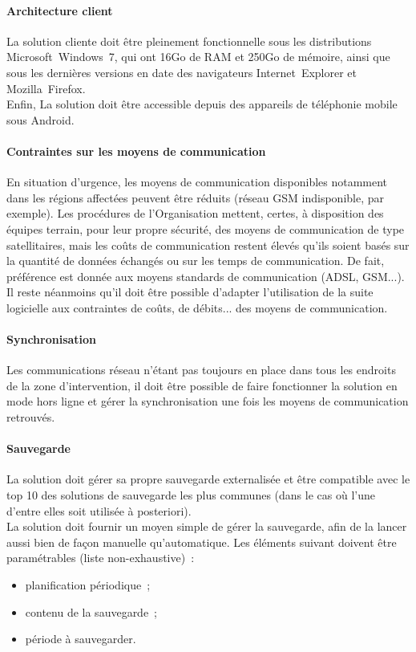 \paragraph{Architecture client}
La solution cliente doit être pleinement fonctionnelle sous les distributions Microsoft~Windows~7, qui ont 16Go de RAM et 250Go de mémoire, ainsi que sous les dernières versions en date des navigateurs Internet~Explorer et Mozilla~Firefox.
\\
Enfin, La solution doit être accessible depuis des appareils de téléphonie mobile sous Android.

\paragraph{Contraintes sur les moyens de communication}
En situation d'urgence, les moyens de communication disponibles notamment dans les régions affectées peuvent être \og{}réduits\fg{} (réseau GSM indisponible, par exemple). Les procédures de l'Organisation mettent, certes, à disposition des équipes terrain, pour leur propre sécurité, des moyens de communication de type satellitaires, mais les coûts de communication restent élevés qu'ils soient basés sur la quantité de données échangés ou sur les temps de communication. De fait, préférence est donnée aux moyens \og{}standards\fg{} de communication (ADSL, GSM...). Il reste néanmoins qu'il doit être possible d'adapter l'utilisation de la suite logicielle aux contraintes de coûts, de débits... des moyens de communication.

\paragraph{Synchronisation}
Les communications réseau n'étant pas toujours en place dans tous les endroits de la zone d'intervention, il doit être possible de faire fonctionner la solution en mode \og{}hors ligne\fg{} et gérer la synchronisation une fois les moyens de communication retrouvés.

\paragraph{Sauvegarde}
La solution doit gérer sa propre sauvegarde externalisée et être compatible avec le top 10 des solutions de sauvegarde les plus communes (dans le cas où l'une d'entre elles soit utilisée à posteriori).
\\
La solution doit fournir un moyen simple de gérer la sauvegarde, afin de la lancer aussi bien de façon manuelle qu'automatique. Les éléments suivant doivent être paramétrables (liste non-exhaustive)~:
\begin{itemize}
\item planification périodique~;
\item contenu de la sauvegarde~;
\item période à sauvegarder.
\end{itemize}

